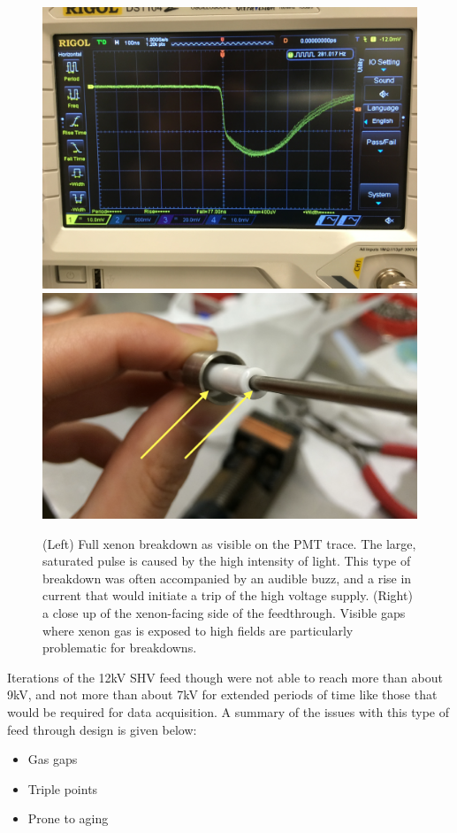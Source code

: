 \begin{figure}[htbp]
\begin{center}
\includegraphics[width=\halffig]{figures/testbed/breakdown.jpg}
\includegraphics[width=\halffig]{figures/testbed/ft_1and2_gasgaps.png}

\caption{(Left) Full xenon breakdown as visible on the PMT trace. The large, saturated pulse is caused by the high intensity of light. This type of breakdown was often accompanied by an audible buzz, and a rise in current that would initiate a trip of the high voltage supply. (Right) a close up of the xenon-facing side of the feedthrough. Visible gaps where xenon gas is exposed to high fields are particularly problematic for breakdowns.}
\label{fig:breakdown}
\end{center}
\end{figure}

Iterations of the 12kV SHV feed though were not able to reach more than about 9kV, and not more than about 7kV for extended periods of time like those that would be required for data acquisition. A summary of the issues with this type of feed through design is given below:
\begin{itemize}
\item Gas gaps
\item Triple points
\item Prone to aging
\end{itemize}

